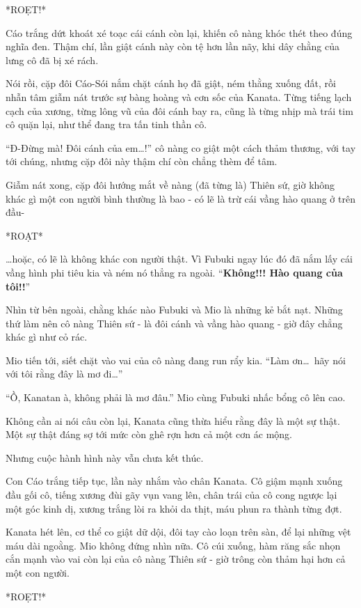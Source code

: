 \documentclass[../main.tex]{subfiles}
\begin{document}
*ROẸT!*

Cáo trắng dứt khoát xé toạc cái cánh còn lại, khiến cô nàng khóc thét theo đúng nghĩa đen. Thậm chí, lần giật cánh này còn tệ hơn lần nãy, khi dây chằng của lưng cô đã bị xé rách.

Nói rồi, cặp đôi Cáo-Sói nắm chặt cánh họ đã giật, ném thằng xuống đất, rồi nhẫn tâm giẫm nát trước sự bàng hoàng và cơn sốc của Kanata. Từng tiếng lạch cạch của xương, từng lông vũ của đôi cánh bay ra, cũng là từng nhịp mà trái tim cô quặn lại, như thể đang tra tấn tinh thần cô.

``Đ-Đừng mà! Đôi cánh của em\dots!'' cô nàng co giật một cách thảm thương, với tay tới chúng, nhưng cặp đôi này thậm chí còn chẳng thèm để tâm.

Giẫm nát xong, cặp đôi hướng mắt về nàng (đã từng là) Thiên sứ, giờ không khác gì một con người bình thường là bao - có lẽ là trừ cái vầng hào quang ở trên đầu-

*ROẠT*

\dots hoặc, có lẽ là không khác con người thật. Vì Fubuki ngay lúc đó đã nắm lấy cái vầng hình phi tiêu kia và ném nó thẳng ra ngoài. ``\textbf{Không!!! Hào quang của tôi!!}''

Nhìn từ bên ngoài, chằng khác nào Fubuki và Mio là những kẻ bắt nạt. Những thứ làm nên cô nàng Thiên sứ - là đôi cánh và vầng hào quang - giờ đây chẳng khác gì như cỏ rác.

Mio tiến tới, siết chặt vào vai của cô nàng đang run rẩy kia. ``Làm ơn\dots\ hãy nói với tôi rằng đây là mơ đi\dots''

``Ồ, Kanatan à, không phải là mơ đâu.'' Mio cùng Fubuki nhấc bổng cô lên cao.

Không cần ai nói câu còn lại, Kanata cũng thừa hiểu rằng đây là một sự thật. Một sự thật đáng sợ tới mức còn ghê rợn hơn cả một cơn ác mộng.

Nhưng cuộc hành hình này vẫn chưa kết thúc.

Con Cáo trắng tiếp tục, lần này nhắm vào chân Kanata. Cô giậm mạnh xuống đầu gối cô, tiếng xương đùi gãy vụn vang lên, chân trái của cô cong ngược lại một góc kinh dị, xương trắng lòi ra khỏi da thịt, máu phun ra thành từng đợt.

Kanata hét lên, cơ thể co giật dữ dội, đôi tay cào loạn trên sàn, để lại những vệt máu dài ngoằng. Mio không đứng nhìn nữa. Cô cúi xuống, hàm răng sắc nhọn cắn mạnh vào vai còn lại của cô nàng Thiên sứ - giờ trông còn thảm hại hơn cả một con người.

*ROẸT!*
\end{document}

